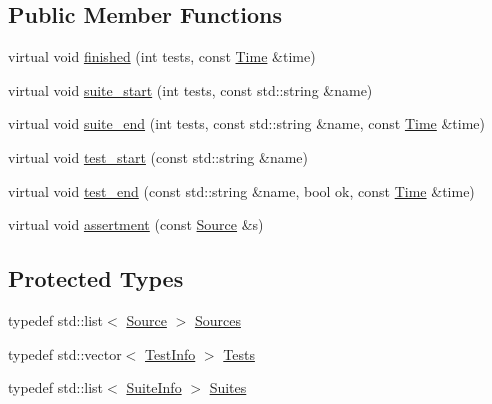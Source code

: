 \subsection*{Public Member Functions}
\begin{DoxyCompactItemize}
\item 
virtual void \mbox{\hyperlink{class_test_1_1_collector_output_ad1a7502a31c58d93f0d88d7a679ab24d}{finished}} (int tests, const \mbox{\hyperlink{class_test_1_1_time}{Time}} \&time)
\item 
virtual void \mbox{\hyperlink{class_test_1_1_collector_output_a1d4c1eb5920fa96fb8dc8fe2eb0c336e}{suite\+\_\+start}} (int tests, const std\+::string \&name)
\item 
virtual void \mbox{\hyperlink{class_test_1_1_collector_output_a50c041adf1de3e296b50b1611e55a407}{suite\+\_\+end}} (int tests, const std\+::string \&name, const \mbox{\hyperlink{class_test_1_1_time}{Time}} \&time)
\item 
virtual void \mbox{\hyperlink{class_test_1_1_collector_output_a0ac72b71fac68305ceabb1c516760eb0}{test\+\_\+start}} (const std\+::string \&name)
\item 
virtual void \mbox{\hyperlink{class_test_1_1_collector_output_a08aa350c9a0ce221d03f6841a0b5d633}{test\+\_\+end}} (const std\+::string \&name, bool ok, const \mbox{\hyperlink{class_test_1_1_time}{Time}} \&time)
\item 
virtual void \mbox{\hyperlink{class_test_1_1_collector_output_a96b61d5e53c3dfa1b98747bb582aa4f3}{assertment}} (const \mbox{\hyperlink{class_test_1_1_source}{Source}} \&s)
\end{DoxyCompactItemize}
\subsection*{Protected Types}
\begin{DoxyCompactItemize}
\item 
typedef std\+::list$<$ \mbox{\hyperlink{class_test_1_1_source}{Source}} $>$ \mbox{\hyperlink{class_test_1_1_collector_output_a1921f35e0da596bd75da5824afe872c9}{Sources}}
\item 
typedef std\+::vector$<$ \mbox{\hyperlink{struct_test_1_1_collector_output_1_1_test_info}{Test\+Info}} $>$ \mbox{\hyperlink{class_test_1_1_collector_output_a54a7b7c9b6d181102bc8934190b06e86}{Tests}}
\item 
typedef std\+::list$<$ \mbox{\hyperlink{struct_test_1_1_collector_output_1_1_suite_info}{Suite\+Info}} $>$ \mbox{\hyperlink{class_test_1_1_collector_output_a0879ce3b51f1e3b3fe14aa5665dccd30}{Suites}}
\end{DoxyCompactItemize}
